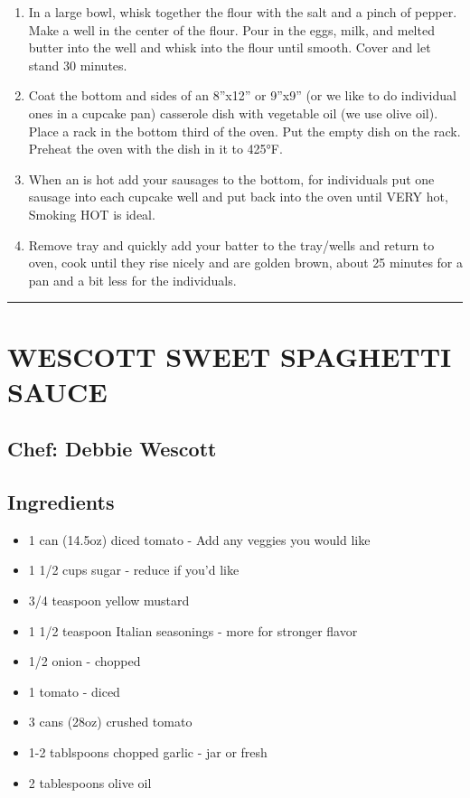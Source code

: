 \documentclass[
]{book}
\providecommand{\tightlist}{%
  \setlength{\itemsep}{0pt}\setlength{\parskip}{0pt}}
\begin{document}
\begin{enumerate}
\def\labelenumi{(\arabic{enumi})}
\tightlist
\item
  In a large bowl, whisk together the flour with the salt and a pinch of pepper. Make a well in the center of the flour.
  Pour in the eggs, milk, and melted butter into the well and whisk into the flour until smooth. Cover and let stand 30 minutes.
\item
  Coat the bottom and sides of an 8''x12'' or 9''x9'' (or we like to do individual ones in a cupcake pan) casserole dish
  with vegetable oil (we use olive oil). Place a rack in the bottom third of the oven. Put the empty dish on the rack.
  Preheat the oven with the dish in it to 425°F.
\item
  When an is hot add your sausages to the bottom, for individuals put one sausage into each cupcake well and put back into
  the oven until VERY hot, Smoking HOT is ideal.
\item
  Remove tray and quickly add your batter to the tray/wells and return to oven, cook until they rise nicely and are
  golden brown, about 25 minutes for a pan and a bit less for the individuals.
\end{enumerate}

\begin{center}\rule{0.5\linewidth}{0.5pt}\end{center}

\hypertarget{wescott-sweet-spaghetti-sauce}{%
\section*{WESCOTT SWEET SPAGHETTI SAUCE}\label{wescott-sweet-spaghetti-sauce}}


\hypertarget{chef-debbie-wescott-3}{%
\subsection*{Chef: Debbie Wescott}\label{chef-debbie-wescott-3}}


\hypertarget{ingredients-70}{%
\subsection*{Ingredients}\label{ingredients-70}}


\begin{itemize}
\tightlist
\item
  1 can (14.5oz) diced tomato - Add any veggies you would like
\item
  1 1/2 cups sugar - reduce if you'd like
\item
  3/4 teaspoon yellow mustard
\item
  1 1/2 teaspoon Italian seasonings - more for stronger flavor
\item
  1/2 onion - chopped
\item
  1 tomato - diced
\item
  3 cans (28oz) crushed tomato
\item
  1-2 tablspoons chopped garlic - jar or fresh
\item
  2 tablespoons olive oil
\end{itemize}
\end{document}
